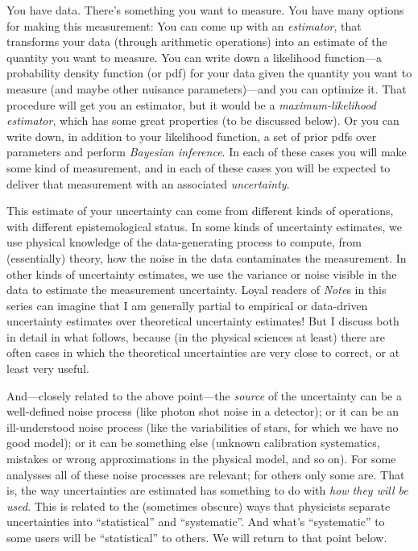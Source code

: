 \documentclass[12pt, letterpaper]{article}
\newcommand{\documentname}{\textsl{Note}}
\begin{document}
You have data. There's something you want to measure. You have many
options for making this measurement: You can come up with an
\textsl{estimator}, that transforms your data (through arithmetic
operations) into an estimate of the quantity you want to measure. You
can write down a likelihood function---a probability density function
(or pdf) for your data given the quantity you want to measure (and
maybe other nuisance parameters)---and you can optimize it. That
procedure will get you an estimator, but it would be a
\textsl{maximum-likelihood estimator}, which has some great
properties (to be discussed below).
Or you can write down, in addition to your likelihood
function, a set of prior pdfs over parameters and perform
\textsl{Bayesian inference}.  In each of these cases you will make
some kind of measurement, and in each of these cases you will be
expected to deliver that measurement with an associated \textsl{uncertainty}.

This estimate of your uncertainty can come from different kinds of operations, with
different epistemological status. In some kinds of uncertainty
estimates, we use physical knowledge of the data-generating process to
compute, from (essentially) theory, how the noise in the data
contaminates the measurement. In other kinds of uncertainty estimates,
we use the variance or noise visible in the data to estimate the measurement
uncertainty. Loyal readers of \documentname s in this series can imagine that
I am generally partial to empirical or data-driven uncertainty estimates over
theoretical uncertainty estimates! But I discuss both in detail in what follows,
because (in the physical sciences at least) there are often cases in which the
theoretical uncertainties are very close to correct, or at least very useful.

And---closely related to the above point---the \emph{source} of the
uncertainty can be a well-defined noise process (like photon shot
noise in a detector); or it can be an ill-understood noise process
(like the variabilities of stars, for which we have no good model); or
it can be something else (unknown calibration systematics, mistakes or
wrong approximations in the physical model, and so on). For some analysses
all of these noise processes are relevant; for others only some are.
That is, the way uncertainties are estimated has something to do with
\emph{how they will be used}. This is related to the (sometimes obscure)
ways that physicists separate uncertainties into ``statistical'' and ``systematic''.
And what's ``systematic'' to some users will be ``statistical'' to others.
We will return to that point below.
\end{document}
